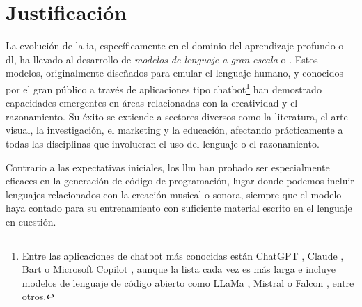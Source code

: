 \section{Justificación}



La evolución de la \gls{ia}, específicamente en el dominio del aprendizaje profundo o \gls{dl}, ha llevado al desarrollo de \emph{modelos de lenguaje a gran escala} o . Estos modelos, originalmente diseñados para emular el lenguaje humano, y conocidos por el gran público a través de aplicaciones tipo {chatbot}\footnote{Entre las aplicaciones de {chatbot} más conocidas están {ChatGPT} \citep{IntroducingChatGPT}, {Claude} \citep{IntroducingClaude}, {Bart} \citep{BardChatbot2024} o {Microsoft Copilot} \citep{mehdiAnnouncingMicrosoftCopilot2023}, aunque la lista cada vez es más larga e incluye modelos de lenguaje de código abierto como {LLaMa} \citep{touvronLLaMAOpenEfficient2023}, {Mistral} \citep{jiangMistral7B2023} o {Falcon} \citep{almazroueiFalconSeriesOpen2023}, entre otros.} han demostrado capacidades emergentes en áreas relacionadas con la creatividad y el razonamiento. Su éxito se extiende a sectores diversos como la literatura, el arte visual, la investigación, el marketing y la educación, afectando prácticamente a todas las disciplinas que involucran el uso del lenguaje o el razonamiento.

Contrario a las expectativas iniciales, los \gls{llm} han probado ser especialmente eficaces en la generación de código de programación, lugar donde podemos incluir lenguajes relacionados con la creación musical o sonora, siempre que el modelo haya contado para su entrenamiento con suficiente material escrito en el lenguaje en cuestión.


